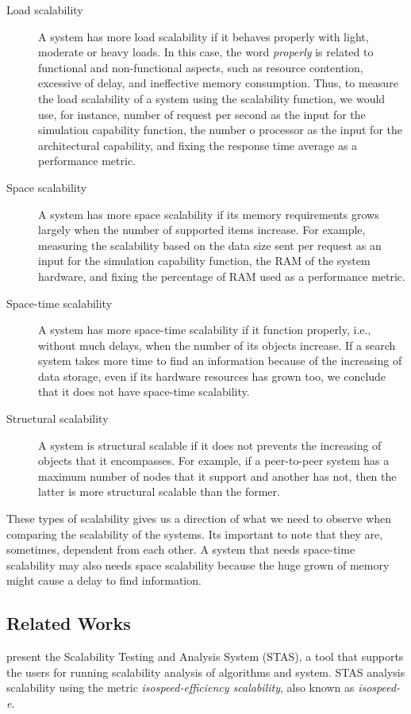 \begin{description}
\item[Load scalability] A system has more load scalability if it behaves properly with light, moderate or heavy loads. In this case, the word \emph{properly} is related to functional and non-functional aspects, such as resource contention, excessive of delay, and ineffective memory consumption. Thus, to measure the load scalability of a system using the scalability function, we would use, for instance,  number of request per second as the input for the simulation capability function, the number o processor as the input for the architectural capability, and fixing the response time average as a performance metric.
\item[Space scalability]  A system has more space scalability if its memory requirements grows largely when the number of supported items increase. For example, measuring the scalability based on the data size sent per request as an input for the simulation capability function, the RAM of the system hardware, and fixing the percentage of RAM used as a performance metric.
\item[Space-time scalability] A system has more space-time scalability if it function properly, i.e., without much delays, when the number of its objects increase. If a search system takes more time to find an information because of the increasing of data storage, even if its hardware resources has grown too, we conclude that it does not have space-time scalability.
\item[Structural scalability] A system is structural scalable if it does not prevents the increasing of objects that it encompasses. For example, if a peer-to-peer system has a maximum number of nodes that it support and another has not, then the latter is more structural scalable than the former.
\end{description}

These types of scalability gives us a direction of what we need to observe when comparing the scalability of the systems. Its important to note that they are, sometimes, dependent from each other. A system that needs space-time scalability may also needs space scalability because the huge grown of memory might cause a delay to find information.

\subsection{Related Works}

\cite{STAS} present the Scalability Testing and Analysis System (STAS), a tool that supports the users for running scalability analysis of algorithms and system. STAS analysis scalability using the metric \emph{isospeed-efficiency scalability}, also known as \emph{isospeed-e}. 

